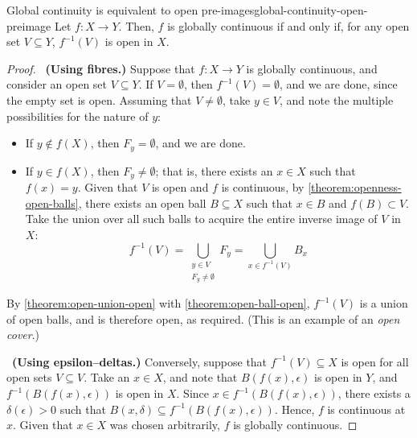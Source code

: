 \documentclass{article}
\newcommand*\iffforward{\par\boxed\Longrightarrow\ }
\newcommand*\iffbackward{\par\boxed\Longleftarrow\ }
\numberwithin{equation}{section}
\numberwithin{figure}{section}
\begin{document}
\begin{theorem}{Global continuity is equivalent to open
        pre-images}{global-continuity-open-preimage}
    Let $ f \colon X \to Y $. Then, $ f $ is globally continuous if and only if,
    for any open set $ V \subseteq Y $, $ f^{-1}(V) $ is open in $ X $.
    \begin{proof}
        \iffforward \textbf{(Using fibres.)} Suppose that $ f \colon X \to Y $
        is globally continuous, and consider an open set $ V \subseteq Y $.  If
        $ V = \emptyset $, then $ f^{-1}(V) = \emptyset $, and we are done,
        since the empty set is open.  Assuming that $ V \neq \emptyset $, take $
        y \in V $, and note the multiple possibilities for the nature of $ y $:
        \begin{itemize}
            \item If $ y \not\in f(X) $, then $ F_y = \emptyset $, and we are
                done.
            \item If $ y \in f(X) $, then $ F_y \neq \emptyset $; that is, there
                exists an $ x \in X $  such that $ f(x) = y $. Given that $ V $
                is open and $ f $ is continuous, by
                \cref{theorem:openness-open-balls}, there exists an open ball $
                B \subseteq X $ such that $ x \in B $ and $ f(B) \subset V $.
                Take the union over all such balls to acquire the entire inverse
                image of $ V $ in $ X $:
                \begin{equation}
                    f^{-1}(V) = \bigcup_{\substack{y \in V \\ F_y \neq
                        \emptyset}} F_y = \bigcup_{x \in f^{-1}(V)} B_x
                \end{equation}
        \end{itemize}
        By \cref{theorem:open-union-open} with \cref{theorem:open-ball-open}, $
        f^{-1}(V) $ is a union of open balls, and is therefore open, as
        required. (This is an example of an \emph{open cover}.)

        \iffbackward \textbf{(Using epsilon--deltas.)} Conversely, suppose that
        $ f^{-1}(V) \subseteq X $ is open for all open sets $ V \subseteq V $.
        Take an $ x \in X $, and note that $ B\left(f(x), \epsilon\right) $ is
        open in $ Y $, and $ f^{-1}\left(B\left(f(x), \epsilon\right)\right) $
        is open in $ X $. Since $ x \in f^{-1}\left(B\left(f(x),
        \epsilon\right)\right) $, there exists a $ \delta(\epsilon) > 0 $ such
        that $ B(x, \delta) \subseteq f^{-1}\left(B\left(f(x),
        \epsilon\right)\right) $. Hence, $ f $ is continuous at $ x $. Given
        that $ x \in X $ was chosen arbitrarily, $ f $ is globally continuous.
    \end{proof}


\end{theorem}
\end{document}

